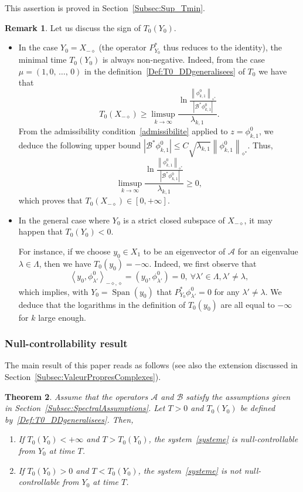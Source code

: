 \documentclass[10pt]{amsart}
\newtheorem{theo}{Theorem}[section]
\theoremstyle{definition}\newtheorem{defi}[theo]{Definition}\newtheorem{rema}[theo]{Remark}\newtheorem{exam}[theo]{Example}\newtheorem{exem}[theo]{Example}\newtheorem{nota}[theo]{Notation}
\newcommand\A{\mathcal{A}}
\newcommand\B{\mathcal{B}}
\newcommand\Bs{\mathcal{B}^*}
\newcommand{\Xun}{X_1}
\newcommand{\Xmalpha}{X_{-\diamond}}
\newcommand{\Fzp}{Y_0}
\newcommand{\normeXalphas}[1]{\left\| #1 \right\|_{\diamond^*}}
\newcommand{\psX}[2]{\left(#1, #2 \right)}
\newcommand{\dual}[2]{\left\langle #1, #2 \right\rangle_{-\diamond,\diamond}}
\newcommand{\PFa}{P_{\Fzp}^*}
\DeclareMathOperator{\Span}{Span}
\newcommand*{\romanenumi}{\renewcommand*{\theenumi}{\roman{enumi}}}
\let\oldforall\forall
\renewcommand*{\forall}{\mathrel{\oldforall}}
\begin{document}
This assertion is proved in Section~\ref{Subsec:Sup_Tmin}.


\begin{rema} \label{Rmq:T0positif}
Let us discuss the sign of $T_0(\Fzp)$.
\begin{itemize}
\item In the case $\Fzp=\Xmalpha$ (the operator $\PFa$ thus reduces to the identity), the minimal time $T_0(\Fzp)$ is always non-negative. Indeed, from the case $\mu = (1, 0,\,\dotsc,\,0)$ in the definition~\eqref{Def:T0_DDgeneralisees} of $T_0$ we have that
\[
T_0(\Xmalpha) \geq \limsup_{k\to \infty} \frac{\ln \frac{ \normeXalphas{\phi_{k,1}^0 } }{ \left| \Bs \phi_{k,1}^0 \right|}}{\lambda_{k,1}}.
\]
From the admissibility condition~\eqref{admissibilite} applied to $z=\phi_{k,1}^0$, we deduce the following upper bound $\left| \Bs \phi_{k,1}^0 \right| \leq C \sqrt{\lambda_{k,1}}\normeXalphas{\phi_{k,1}^0 }$. Thus,
\[
\limsup_{k\to \infty} \frac{\ln \frac{ \normeXalphas{\phi_{k,1}^0 } }{ \left| \Bs \phi_{k,1}^0 \right|}}{\lambda_{k,1}} \geq 0,
\]
which proves that $T_0(\Xmalpha) \in [0,+\infty]$.
\item In the general case where $\Fzp$ is a strict closed subspace of $\Xmalpha$, it may happen that $T_0(\Fzp)<0$.

For instance, if we choose $y_0\in \Xun$ to be an eigenvector of $\A$ for an eigenvalue $\lambda\in \Lambda$, then we have $T_0(y_0)=-\infty$. Indeed, we first observe that
\[
\dual{y_0}{\phi_{\lambda'}^0} = \psX{y_0}{\phi_{\lambda'}^0} = 0, \ \forall \lambda'\in \Lambda, \lambda'\neq \lambda,
\]
which implies, with $\Fzp=\Span(y_0)$ that $\PFa \phi_{\lambda'}^0=0$ for any $\lambda'\neq \lambda$. We deduce that the logarithms in the definition of $T_0(y_0)$ are all equal to $-\infty$ for $k$ large enough.
\end{itemize}
\end{rema}



\subsubsection{Null-controllability result}\label{Sect:mainresult}



The main result of this paper reads as follows (see also the extension discussed in Section~\ref{Subsec:ValeurPropresComplexes}).

\begin{theo} \label{Thm:Main}
Assume that the operators $\A$ and $\B$ satisfy the assumptions given in Section~\ref{Subsec:SpectralAssumptions}. Let $T>0$ and $T_0(\Fzp)$ be defined by~\eqref{Def:T0_DDgeneralisees}. Then,
\begin{enumerate}\romanenumi
\item \label{Thm:Main_pt1}
If $T_0(\Fzp) <+\infty$ and $T>T_0(\Fzp)$, the system~\eqref{systeme} is null-controllable from $\Fzp$ at time $T$.
\item \label{Thm:Main_pt2}
If $T_0(\Fzp) >0$ and $T<T_0(\Fzp)$, the system~\eqref{systeme} is not null-controllable from $\Fzp$ at time $T$.
\end{enumerate}
\end{theo}
\end{document}
